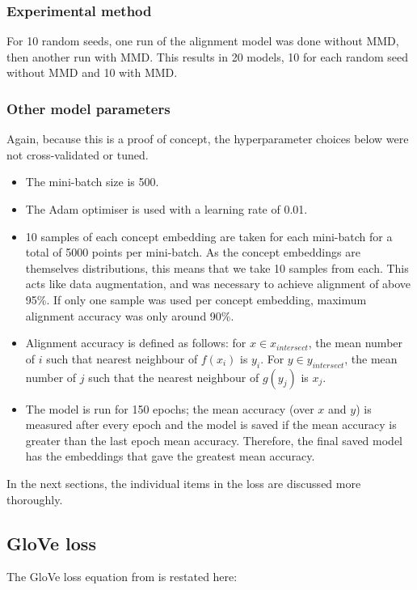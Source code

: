 \subsubsection{Experimental method}

For 10 random seeds, one run of the alignment model was done without MMD, then another run with MMD. This results in 20 models, 10 for each random seed without MMD and 10 with MMD. 

\subsubsection{Other model parameters}

Again, because this is a proof of concept, the hyperparameter choices below were not cross-validated or tuned. 

\label{section:otherparameters}
\begin{itemize}
    \item The mini-batch size is 500.
    \item The Adam \cite{kingma2017adam} optimiser is used with a learning rate of 0.01.
    \item 10 samples of each concept embedding are taken for each mini-batch for a total of 5000 points per mini-batch. As the concept embeddings are themselves distributions, this means that we take 10 samples from each. This acts like data augmentation, and was necessary to achieve alignment of above 95\%. If only one sample was used per concept embedding, maximum alignment accuracy was only around 90\%. 
    \item Alignment accuracy is defined as follows: for $x \in x_{intersect}$, the mean number of $i$ such that nearest neighbour of $f(x_i)$ is  $y_i$. For $y \in y_{intersect}$, the mean number of $j$ such that the nearest neighbour of $g(y_j)$ is $x_j$. 
    \item The model is run for 150 epochs; the mean accuracy (over $x$ and $y$) is measured after every epoch and the model is saved if the mean accuracy is greater than the last epoch mean accuracy. Therefore, the final saved model has the embeddings that gave the greatest mean accuracy. 
\end{itemize}


In the next sections, the individual items in the loss are discussed more thoroughly.

\subsection{GloVe loss}
\label{section:gloveloss}
The GloVe loss equation from \cite{pennington2014glove} is restated here:

